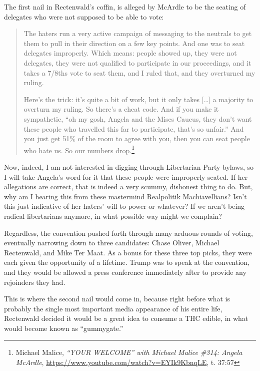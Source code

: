 \documentclass[11pt]{article}
\begin{document}
The first nail in Rectenwald's coffin, is alleged by McArdle to be the seating of delegates who were not supposed to be able to vote:
\begin{quote}
The haters run a very active campaign of messaging to the neutrals to get them to pull in their direction on a few key points. And one was to seat delegates improperly. Which means: people showed up, they were not delegates, they were not qualified to participate in our proceedings, and it takes a 7/8ths vote to seat them, and I ruled that, and they overturned my ruling.

Here's the trick: it's quite a bit of work, but it only takes [\ldots{}] a majority to overturn my ruling. So there's a cheat code. And if you make it sympathetic, ``oh my gosh, Angela and the Mises Caucus, they don't want these people who travelled this far to participate, that's so unfair.'' And you just get 51\% of the room to agree with you, then you can seat people who hate us. So our numbers drop.\footnote{Michael Malice, \emph{``YOUR WELCOME'' with Michael Malice \#314: Angela McArdle}, \url{https://www.youtube.com/watch?v=EYIk9KbnqLE}, t. 37:57}
\end{quote}

Now, indeed, I am not interested in digging through Libertarian Party bylaws, so I will take Angela's word for it that these people were improperly seated. If her allegations are correct, that is indeed a very scummy, dishonest thing to do. But, why am I hearing this from these mastermind Realpolitik Machiavellians? Isn't this just indicative of her haters' will to power or whatever? If we aren't being radical libertarians anymore, in what possible way might we complain?

Regardless, the convention pushed forth through many arduous rounds of voting, eventually narrowing down to three candidates: Chase Oliver, Michael Rectenwald, and Mike Ter Maat. As a bonus for these three top picks, they were each given the opportunity of a lifetime. Trump was to speak at the convention, and they would be allowed a press conference immediately after to provide any rejoinders they had.

This is where the second nail would come in, because right before what is probably the single most important media appearance of his entire life, Rectenwald decided it would be a great idea to consume a THC edible, in what would become known as ``gummygate.''
\end{document}
